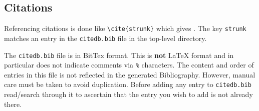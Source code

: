 \subsection{Citations}

Referencing citations is done like \verb|\cite{strunk}| which gives \cite{strunk}.
The key \texttt{strunk} matches an entry in the \texttt{citedb.bib}
file in the top-level directory.


The \texttt{citedb.bib} file is in BitTex format.
This is \textbf{not} \LaTeX{} format and in particular does not
indicate comments via \texttt{\%} characters.
The content and order of entries in this file is not reflected in the
generated Bibliography.
However, manual care must be taken to avoid duplication.
Before adding any entry to \texttt{citedb.bib} read/search through it
to ascertain that the entry you wish to add is not already there.






